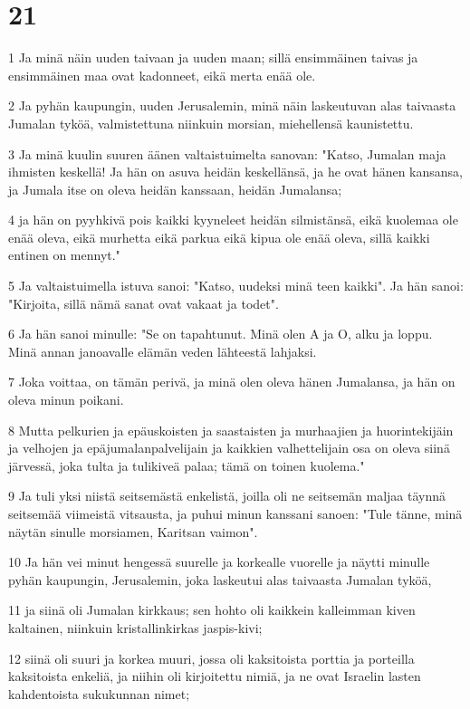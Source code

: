 \chapter{21}

\par 1 Ja minä näin uuden taivaan ja uuden maan; sillä ensimmäinen taivas ja ensimmäinen maa ovat kadonneet, eikä merta enää ole.
\par 2 Ja pyhän kaupungin, uuden Jerusalemin, minä näin laskeutuvan alas taivaasta Jumalan tyköä, valmistettuna niinkuin morsian, miehellensä kaunistettu.
\par 3 Ja minä kuulin suuren äänen valtaistuimelta sanovan: "Katso, Jumalan maja ihmisten keskellä! Ja hän on asuva heidän keskellänsä, ja he ovat hänen kansansa, ja Jumala itse on oleva heidän kanssaan, heidän Jumalansa;
\par 4 ja hän on pyyhkivä pois kaikki kyyneleet heidän silmistänsä, eikä kuolemaa ole enää oleva, eikä murhetta eikä parkua eikä kipua ole enää oleva, sillä kaikki entinen on mennyt."
\par 5 Ja valtaistuimella istuva sanoi: "Katso, uudeksi minä teen kaikki". Ja hän sanoi: "Kirjoita, sillä nämä sanat ovat vakaat ja todet".
\par 6 Ja hän sanoi minulle: "Se on tapahtunut. Minä olen A ja O, alku ja loppu. Minä annan janoavalle elämän veden lähteestä lahjaksi.
\par 7 Joka voittaa, on tämän perivä, ja minä olen oleva hänen Jumalansa, ja hän on oleva minun poikani.
\par 8 Mutta pelkurien ja epäuskoisten ja saastaisten ja murhaajien ja huorintekijäin ja velhojen ja epäjumalanpalvelijain ja kaikkien valhettelijain osa on oleva siinä järvessä, joka tulta ja tulikiveä palaa; tämä on toinen kuolema."
\par 9 Ja tuli yksi niistä seitsemästä enkelistä, joilla oli ne seitsemän maljaa täynnä seitsemää viimeistä vitsausta, ja puhui minun kanssani sanoen: "Tule tänne, minä näytän sinulle morsiamen, Karitsan vaimon".
\par 10 Ja hän vei minut hengessä suurelle ja korkealle vuorelle ja näytti minulle pyhän kaupungin, Jerusalemin, joka laskeutui alas taivaasta Jumalan tyköä,
\par 11 ja siinä oli Jumalan kirkkaus; sen hohto oli kaikkein kalleimman kiven kaltainen, niinkuin kristallinkirkas jaspis-kivi;
\par 12 siinä oli suuri ja korkea muuri, jossa oli kaksitoista porttia ja porteilla kaksitoista enkeliä, ja niihin oli kirjoitettu nimiä, ja ne ovat Israelin lasten kahdentoista sukukunnan nimet;
